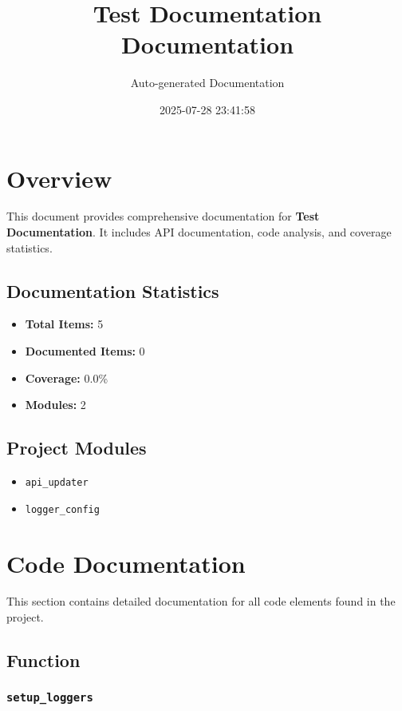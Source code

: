 \documentclass[11pt,a4paper]{article}
\title{Test Documentation\\Documentation}
\author{Auto-generated Documentation}
\date{2025-07-28 23:41:58}
\begin{document}
\maketitle
\thispagestyle{empty}

\newpage
\tableofcontents
\newpage

\section{Overview}

This document provides comprehensive documentation for \textbf{Test Documentation}. It includes API documentation, code analysis, and coverage statistics.

\subsection{Documentation Statistics}

\begin{itemize}
    \item \textbf{Total Items:} 5
    \item \textbf{Documented Items:} 0
    \item \textbf{Coverage:} 0.0\%
    \item \textbf{Modules:} 2
\end{itemize}

\subsection{Project Modules}

\begin{itemize}
    \item \texttt{api_updater}
    \item \texttt{logger_config}
\end{itemize}

\section{Code Documentation}

This section contains detailed documentation for all code elements found in the project.

\subsection{Function}

\subsubsection{\texttt{setup\_loggers}}
\end{document}
